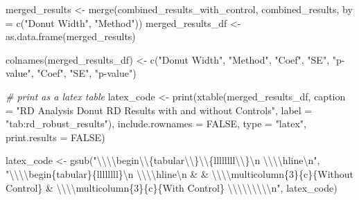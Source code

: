 \documentclass[
]{article}
\newenvironment{Shaded}{\begin{snugshade}}{\end{snugshade}}
\newcommand{\AttributeTok}[1]{\textcolor[rgb]{0.77,0.63,0.00}{#1}}
\newcommand{\CommentTok}[1]{\textcolor[rgb]{0.56,0.35,0.01}{\textit{#1}}}
\newcommand{\ConstantTok}[1]{\textcolor[rgb]{0.00,0.00,0.00}{#1}}
\newcommand{\FunctionTok}[1]{\textcolor[rgb]{0.00,0.00,0.00}{#1}}
\newcommand{\NormalTok}[1]{#1}
\newcommand{\OtherTok}[1]{\textcolor[rgb]{0.56,0.35,0.01}{#1}}
\newcommand{\SpecialCharTok}[1]{\textcolor[rgb]{0.00,0.00,0.00}{#1}}
\newcommand{\StringTok}[1]{\textcolor[rgb]{0.31,0.60,0.02}{#1}}
\begin{document}
\begin{Shaded}
\begin{Highlighting}[]
\NormalTok{merged\_results }\OtherTok{\textless{}{-}} \FunctionTok{merge}\NormalTok{(combined\_results\_with\_control, combined\_results, }\AttributeTok{by =} \FunctionTok{c}\NormalTok{(}\StringTok{"Donut Width"}\NormalTok{,}
    \StringTok{"Method"}\NormalTok{))}
\NormalTok{merged\_results\_df }\OtherTok{\textless{}{-}} \FunctionTok{as.data.frame}\NormalTok{(merged\_results)}

\FunctionTok{colnames}\NormalTok{(merged\_results\_df) }\OtherTok{\textless{}{-}} \FunctionTok{c}\NormalTok{(}\StringTok{"Donut Width"}\NormalTok{, }\StringTok{"Method"}\NormalTok{, }\StringTok{"Coef"}\NormalTok{, }\StringTok{"SE"}\NormalTok{, }\StringTok{"p{-}value"}\NormalTok{,}
    \StringTok{"Coef"}\NormalTok{, }\StringTok{"SE"}\NormalTok{, }\StringTok{"p{-}value"}\NormalTok{)}

\CommentTok{\# print as a latex table}
\NormalTok{latex\_code }\OtherTok{\textless{}{-}} \FunctionTok{print}\NormalTok{(}\FunctionTok{xtable}\NormalTok{(merged\_results\_df, }\AttributeTok{caption =} \StringTok{"RD Analysis Donut RD Results with and without Controls"}\NormalTok{,}
    \AttributeTok{label =} \StringTok{"tab:rd\_robust\_results"}\NormalTok{), }\AttributeTok{include.rownames =} \ConstantTok{FALSE}\NormalTok{, }\AttributeTok{type =} \StringTok{"latex"}\NormalTok{, }\AttributeTok{print.results =} \ConstantTok{FALSE}\NormalTok{)}

\NormalTok{latex\_code }\OtherTok{\textless{}{-}} \FunctionTok{gsub}\NormalTok{(}\StringTok{"}\SpecialCharTok{\textbackslash{}\textbackslash{}\textbackslash{}\textbackslash{}}\StringTok{begin}\SpecialCharTok{\textbackslash{}\textbackslash{}}\StringTok{\{tabular}\SpecialCharTok{\textbackslash{}\textbackslash{}}\StringTok{\}}\SpecialCharTok{\textbackslash{}\textbackslash{}}\StringTok{\{llllllll}\SpecialCharTok{\textbackslash{}\textbackslash{}}\StringTok{\}}\SpecialCharTok{\textbackslash{}n}\StringTok{  }\SpecialCharTok{\textbackslash{}\textbackslash{}\textbackslash{}\textbackslash{}}\StringTok{hline}\SpecialCharTok{\textbackslash{}n}\StringTok{"}\NormalTok{, }\StringTok{"}\SpecialCharTok{\textbackslash{}\textbackslash{}\textbackslash{}\textbackslash{}}\StringTok{begin\{tabular\}\{llllllll\}}\SpecialCharTok{\textbackslash{}n}\StringTok{  }\SpecialCharTok{\textbackslash{}\textbackslash{}\textbackslash{}\textbackslash{}}\StringTok{hline}\SpecialCharTok{\textbackslash{}n}\StringTok{ \&  \& }\SpecialCharTok{\textbackslash{}\textbackslash{}\textbackslash{}\textbackslash{}}\StringTok{multicolumn\{3\}\{c\}\{Without Control\} \& }\SpecialCharTok{\textbackslash{}\textbackslash{}\textbackslash{}\textbackslash{}}\StringTok{multicolumn\{3\}\{c\}\{With Control\} }\SpecialCharTok{\textbackslash{}\textbackslash{}\textbackslash{}\textbackslash{}\textbackslash{}\textbackslash{}\textbackslash{}\textbackslash{}\textbackslash{}n}\StringTok{"}\NormalTok{,}
\NormalTok{    latex\_code)}


\end{Highlighting}
\end{Shaded}
\end{document}
